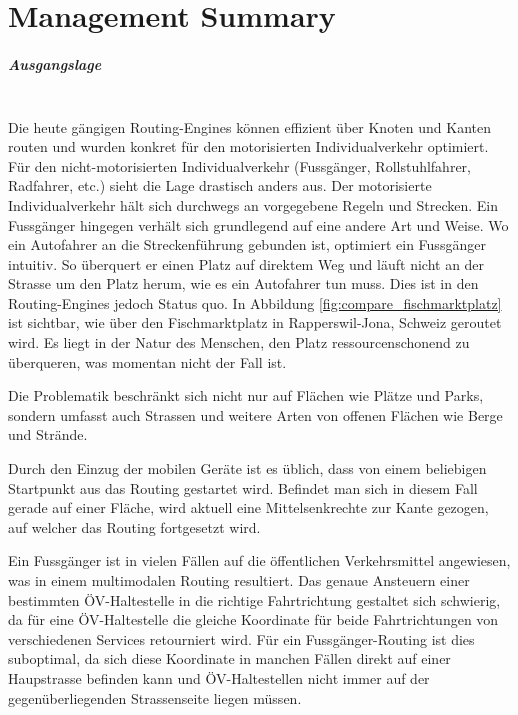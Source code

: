 
\chapter*{Management Summary}

\paragraph{Ausgangslage}~\\
Die heute gängigen \glspl{Routing-Engine} können effizient über Knoten und Kanten routen und wurden konkret für den motorisierten Individualverkehr optimiert. Für den nicht-motorisierten Individualverkehr (Fussgänger, Rollstuhlfahrer, Radfahrer, etc.) sieht die Lage drastisch anders aus. Der motorisierte Individualverkehr hält sich durchwegs an vorgegebene Regeln und Strecken. Ein Fussgänger hingegen verhält sich grundlegend auf eine andere Art und Weise. Wo ein Autofahrer an die Streckenführung gebunden ist, optimiert ein Fussgänger intuitiv. So überquert er einen Platz auf direktem Weg und läuft nicht an der Strasse um den Platz herum, wie es ein Autofahrer tun muss. Dies ist in den Routing-Engines jedoch Status quo. In Abbildung \ref{fig:compare_fischmarktplatz} ist sichtbar, wie über den Fischmarktplatz in Rapperswil-Jona, Schweiz geroutet wird. Es liegt in der Natur des Menschen, den Platz ressourcenschonend zu überqueren, was momentan nicht der Fall ist.

Die Problematik beschränkt sich nicht nur auf Flächen wie Plätze und Parks, sondern umfasst auch Strassen und weitere Arten von offenen Flächen wie Berge und Strände.

Durch den Einzug der mobilen Geräte ist es üblich, dass von einem beliebigen Startpunkt aus das Routing gestartet wird. Befindet man sich in diesem Fall gerade auf einer Fläche, wird aktuell eine Mittelsenkrechte zur Kante gezogen, auf welcher das Routing fortgesetzt wird.

Ein Fussgänger ist in vielen Fällen auf die öffentlichen Verkehrsmittel angewiesen, was in einem multimodalen Routing resultiert. Das genaue Ansteuern einer bestimmten ÖV-Haltestelle in die richtige Fahrtrichtung gestaltet sich schwierig, da für eine ÖV-Haltestelle die gleiche Koordinate für beide Fahrtrichtungen von verschiedenen Services retourniert wird. Für ein Fussgänger-Routing ist dies suboptimal, da sich diese Koordinate in manchen Fällen direkt auf einer Haupstrasse befinden kann und ÖV-Haltestellen nicht immer auf der gegenüberliegenden Strassenseite liegen müssen.

